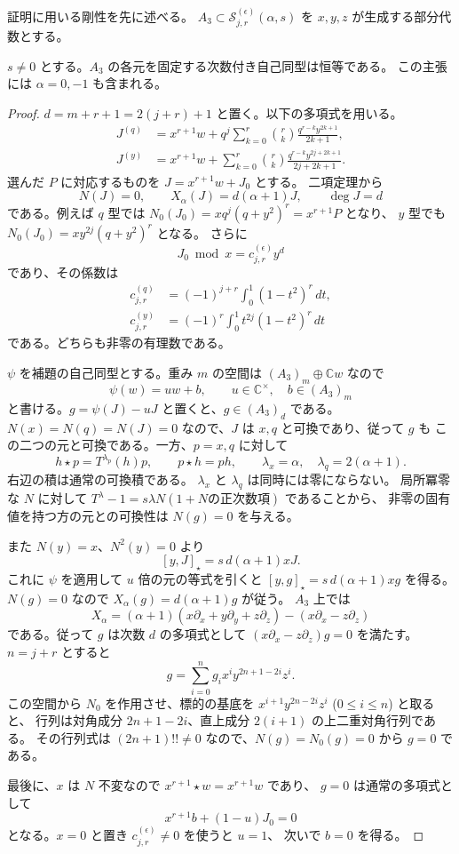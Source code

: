 証明に用いる剛性を先に述べる。
$A_3\subset\mathcal S_{j,r}^{(\epsilon)}(\alpha,s)$ を
$x,y,z$ が生成する部分代数とする。

\begin{lemma}[最後の生成元の剛性]
\label{lem:affine-last-generator-v34}
$s\ne0$ とする。$A_3$ の各元を固定する次数付き自己同型は恒等である。
この主張には $\alpha=0,-1$ も含まれる。
\end{lemma}

\begin{proof}
$d=m+r+1=2(j+r)+1$ と置く。以下の多項式を用いる。
\begin{align*}
 J^{(q)}&=x^{r+1}w+
 q^j\sum_{k=0}^{r}\binom rk\frac{q^{r-k}y^{2k+1}}{2k+1},\\
 J^{(y)}&=x^{r+1}w+
 \sum_{k=0}^{r}\binom rk\frac{q^{r-k}y^{2j+2k+1}}{2j+2k+1}.
\end{align*}
選んだ $P$ に対応するものを $J=x^{r+1}w+J_0$ とする。
二項定理から
\[
 N(J)=0,\qquad X_\alpha(J)=d(\alpha+1)J,\qquad \deg J=d
\]
である。例えば $q$ 型では
$N_0(J_0)=xq^j(q+y^2)^r=x^{r+1}P$ となり、
$y$ 型でも $N_0(J_0)=xy^{2j}(q+y^2)^r$ となる。
さらに
\[
 J_0\bmod x=c_{j,r}^{(\epsilon)}y^d
\]
であり、その係数は
\begin{align*}
 c_{j,r}^{(q)}&=(-1)^{j+r}\int_0^1(1-t^2)^r\,dt,\\
 c_{j,r}^{(y)}&=(-1)^r\int_0^1t^{2j}(1-t^2)^r\,dt
\end{align*}
である。どちらも非零の有理数である。

$\psi$ を補題の自己同型とする。重み $m$ の空間は
$(A_3)_m\oplus\mathbb Cw$ なので
\[
 \psi(w)=uw+b,\qquad u\in\mathbb C^\times,\quad b\in(A_3)_m
\]
と書ける。$g=\psi(J)-uJ$ と置くと、$g\in(A_3)_d$ である。
$N(x)=N(q)=N(J)=0$ なので、$J$ は $x,q$ と可換であり、従って $g$ も
この二つの元と可換である。一方、$p=x,q$ に対して
\[
 h\star p=T^{\lambda_p}(h)p,\qquad p\star h=ph,
 \qquad \lambda_x=\alpha,\quad\lambda_q=2(\alpha+1).
\]
右辺の積は通常の可換積である。
$\lambda_x$ と $\lambda_q$ は同時には零にならない。
局所冪零な $N$ に対して
$T^\lambda-1=s\lambda N(1+\text{$N$の正次数項})$ であることから、
非零の固有値を持つ方の元との可換性は $N(g)=0$ を与える。

また $N(y)=x$、$N^2(y)=0$ より
\[
 [y,J]_\star=s\,d(\alpha+1)xJ.
\]
これに $\psi$ を適用して $u$ 倍の元の等式を引くと
$[y,g]_\star=s\,d(\alpha+1)xg$ を得る。
$N(g)=0$ なので $X_\alpha(g)=d(\alpha+1)g$ が従う。
$A_3$ 上では
\[
 X_\alpha=(\alpha+1)(x\partial_x+y\partial_y+z\partial_z)
              -(x\partial_x-z\partial_z)
\]
である。従って $g$ は次数 $d$ の多項式として
$(x\partial_x-z\partial_z)g=0$ を満たす。
$n=j+r$ とすると
\[
 g=\sum_{i=0}^{n}g_i x^i y^{2n+1-2i}z^i.
\]
この空間から $N_0$ を作用させ、標的の基底を
$x^{i+1}y^{2n-2i}z^i$ ($0\le i\le n$) と取ると、
行列は対角成分 $2n+1-2i$、直上成分 $2(i+1)$ の上二重対角行列である。
その行列式は $(2n+1)!!\ne0$ なので、$N(g)=N_0(g)=0$ から $g=0$ である。

最後に、$x$ は $N$ 不変なので $x^{r+1}\star w=x^{r+1}w$ であり、
$g=0$ は通常の多項式として
\[
 x^{r+1}b+(1-u)J_0=0
\]
となる。$x=0$ と置き $c_{j,r}^{(\epsilon)}\ne0$ を使うと $u=1$、
次いで $b=0$ を得る。
\end{proof}

